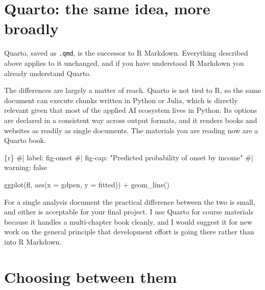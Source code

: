 \documentclass[
  a4paper,
]{scrbook}
\newenvironment{Shaded}{\begin{snugshade}}{\end{snugshade}}
\newcommand{\AttributeTok}[1]{\textcolor[rgb]{0.40,0.45,0.13}{#1}}
\newcommand{\CommentTok}[1]{\textcolor[rgb]{0.37,0.37,0.37}{#1}}
\newcommand{\FunctionTok}[1]{\textcolor[rgb]{0.28,0.35,0.67}{#1}}
\newcommand{\InformationTok}[1]{\textcolor[rgb]{0.37,0.37,0.37}{#1}}
\newcommand{\NormalTok}[1]{\textcolor[rgb]{0.00,0.23,0.31}{#1}}
\newcommand{\SpecialCharTok}[1]{\textcolor[rgb]{0.37,0.37,0.37}{#1}}
\begin{document}
\section*{Quarto: the same idea, more
broadly}\label{quarto-the-same-idea-more-broadly}


Quarto, saved as \texttt{.qmd}, is the successor to R Markdown.
Everything described above applies to it unchanged, and if you have
understood R Markdown you already understand Quarto.

The differences are largely a matter of reach. Quarto is not tied to R,
so the same document can execute chunks written in Python or Julia,
which is directly relevant given that most of the applied AI ecosystem
lives in Python. Its options are declared in a consistent way across
output formats, and it renders books and websites as readily as single
documents. The materials you are reading now are a Quarto book.

\begin{Shaded}
\begin{Highlighting}[]
\InformationTok{\textasciigrave{}\textasciigrave{}\textasciigrave{}\{r\}}
\CommentTok{\#| label: fig{-}onset}
\CommentTok{\#| fig{-}cap: "Predicted probability of onset by income"}
\CommentTok{\#| warning: false}

\FunctionTok{ggplot}\NormalTok{(fl, }\FunctionTok{aes}\NormalTok{(}\AttributeTok{x =}\NormalTok{ gdpen, }\AttributeTok{y =}\NormalTok{ fitted)) }\SpecialCharTok{+}
  \FunctionTok{geom\_line}\NormalTok{()}
\InformationTok{\textasciigrave{}\textasciigrave{}\textasciigrave{}}
\end{Highlighting}
\end{Shaded}

For a single analysis document the practical difference between the two
is small, and either is acceptable for your final project. I use Quarto
for course materials because it handles a multi-chapter book cleanly,
and I would suggest it for new work on the general principle that
development effort is going there rather than into R Markdown.

\section*{Choosing between them}\label{choosing-between-them}
\end{document}
